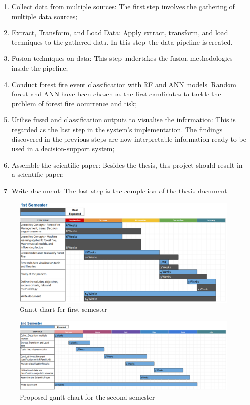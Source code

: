 \begin{enumerate}
    \item Collect data from multiple sources: The first step involves the gathering of multiple data sources;
    \item Extract, Transform, and Load Data: Apply extract, transform, and load techniques to the gathered data. In this step, the data pipeline is created.
    \item Fusion techniques on data: This step undertakes the fusion methodologies inside the pipeline;
    \item Conduct forest fire event classification with RF and ANN models: Random forest and ANN have been chosen as the first candidates to tackle the problem of forest fire occurrence and risk;
    \item Utilise fused and classification outputs to visualise the information: This is regarded as the last step in the system's implementation. The findings discovered in the previous steps are now interpretable information ready to be used in a decision-support system;
    \item Assemble the scientific paper: Besides the thesis, this project should result in a scientific paper;
    \item Write document: The last step is the completion of the thesis document.
\end{enumerate}

\begin{figure}[h!]
 \centering
  \includegraphics[width=1.0\linewidth]{frontmatter/imgs/g1.png}
  \caption{Gantt chart for first semester}
  \label{fig:gantt_first}
\end{figure}

\begin{figure}[h!]
 \centering
  \includegraphics[width=1.0\linewidth]{frontmatter/imgs/g2.png}
  \caption{Proposed gantt chart for the second semester}
  \label{fig:gantt_second}
\end{figure}


